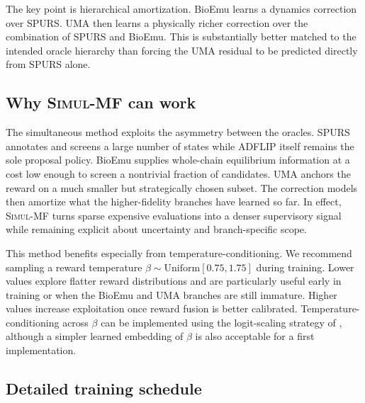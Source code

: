 \documentclass[11pt]{article}
\newcommand{\methodI}{\textsc{Simul-MF}}
\begin{document}
The key point is hierarchical amortization. BioEmu learns a dynamics correction over SPURS. UMA then learns a physically richer correction over the combination of SPURS and BioEmu. This is substantially better matched to the intended oracle hierarchy than forcing the UMA residual to be predicted directly from SPURS alone.


\subsection{Why \methodI{} can work}

The simultaneous method exploits the asymmetry between the oracles. SPURS annotates and screens a large number of states while ADFLIP itself remains the sole proposal policy. BioEmu supplies whole-chain equilibrium information at a cost low enough to screen a nontrivial fraction of candidates. UMA anchors the reward on a much smaller but strategically chosen subset. The correction models then amortize what the higher-fidelity branches have learned so far. In effect, \methodI{} turns sparse expensive evaluations into a denser supervisory signal while remaining explicit about uncertainty and branch-specific scope.

This method benefits especially from temperature-conditioning. We recommend sampling a reward temperature $\beta\sim\mathrm{Uniform}[0.75,1.75]$ during training. Lower values explore flatter reward distributions and are particularly useful early in training or when the BioEmu and UMA branches are still immature. Higher values increase exploitation once reward fusion is better calibrated. Temperature-conditioning across $\beta$ can be implemented using the logit-scaling strategy of \citet{kim2023lsl-gfn}, although a simpler learned embedding of $\beta$ is also acceptable for a first implementation.


\subsection{Detailed training schedule}
\end{document}
